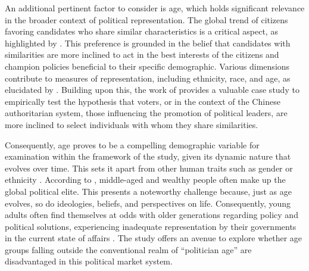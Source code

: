 \documentclass[12pt, ]{article}
\begin{document}
An additional pertinent factor to consider is age, which holds
significant relevance in the broader context of political
representation. The global trend of citizens favoring candidates who
share similar characteristics is a critical aspect, as highlighted by
\citet{sevi2021young}. This preference is grounded in the belief that
candidates with similarities are more inclined to act in the best
interests of the citizens and champion policies beneficial to their
specific demographic. Various dimensions contribute to measures of
representation, including ethnicity, race, and age, as elucidated by
\citet{sevi2021young}. Building upon this, the work of
\citet{lei2022private} provides a valuable case study to empirically
test the hypothesis that voters, or in the context of the Chinese
authoritarian system, those influencing the promotion of political
leaders, are more inclined to select individuals with whom they share
similarities.

Consequently, age proves to be a compelling demographic variable for
examination within the framework of the \citet{lei2022private} study,
given its dynamic nature that evolves over time. This sets it apart from
other human traits such as gender or ethnicity \citep{stockemer2018age}.
According to \citet{stockemer2018age}, middle-aged and wealthy people
often make up the global political elite. This presents a noteworthy
challenge because, just as age evolves, so do ideologies, beliefs, and
perspectives on life. Consequently, young adults often find themselves
at odds with older generations regarding policy and political solutions,
experiencing inadequate representation by their governments in the
current state of affairs \citep{stockemer2018age}. The
\citet{lei2022private} study offers an avenue to explore whether age
groups falling outside the conventional realm of ``politician age'' are
disadvantaged in this political market system.
\end{document}
